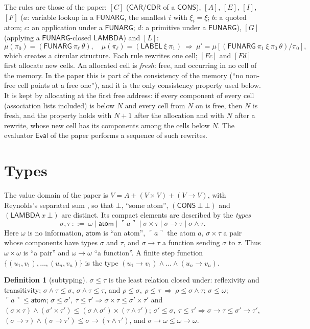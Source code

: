 \documentclass[11pt]{amsart}
\theoremstyle{definition}
\newtheorem{definition}[theorem]{Definition}
\theoremstyle{remark}
\newcommand{\kw}[1]{\mathsf{#1}}
\newcommand{\at}[1]{\ulcorner #1\urcorner}
\newcommand{\Atom}{\mathsf{atom}}
\begin{document}
The rules are those of the paper:
$[C]$ ($\kw{CAR}/\kw{CDR}$ of a $\kw{CONS}$), $[A]$, $[E]$, $[I]$,
$[F]$ ($a$: variable lookup in a $\kw{FUNARG}$, the smallest $i$ with
$\xi_i=\xi$; $b$: a quoted atom; $c$: an application under a $\kw{FUNARG}$;
$d$: a primitive under a $\kw{FUNARG}$), $[G]$ (applying a
$\kw{FUNARG}$-closed $\kw{LAMBDA}$) and $[L]$:
\[
\mu(\pi_0)=(\kw{FUNARG}\ \pi_\ell\ \theta),\quad \mu(\pi_\ell)=(\kw{LABEL}\ \xi\ \pi_1)
\ \Longrightarrow\ \mu'=\mu[(\kw{FUNARG}\ \pi_1\ \xi\ \pi_0\ \theta)/\pi_0],
\]
which creates a circular structure. Each rule rewrites one cell; $[Fc]$ and
$[Fd]$ first allocate new cells. An allocated cell is \emph{fresh}: free, and
occurring in no cell of the memory. In the paper this is part of the
consistency of the memory (``no non-free cell points at a free one''), and
it is the only consistency property used below. It is kept by allocating at
the first free address: if every component of every cell (association lists
included) is below $N$ and every cell from $N$ on is free, then $N$ is fresh,
and the property holds with $N+1$ after the allocation and with $N$ after a
rewrite, whose new cell has its components among the cells below $N$. The
evaluator $\kw{Eval}$ of the paper performs a sequence of such rewrites.

\section{Types}

The value domain of the paper is $V=A+(V\times V)+(V\to V)$, with Reynolds's
separated sum \cite{Rey71}, so that $\bot$, ``some atom'', $(\kw{CONS}\ \bot\ \bot)$ and
$(\kw{LAMBDA}\ x\ \bot)$ are distinct. Its compact elements are described by
the \emph{types}
\[
\sigma,\tau\ ::=\ \omega\mid \Atom\mid \at{a}\mid \sigma\times\tau\mid \sigma\to\tau\mid \sigma\wedge\tau .
\]
Here $\omega$ is no information, $\Atom$ is ``an atom'', $\at a$ the atom
$a$, $\sigma\times\tau$ a pair whose components have types $\sigma$ and
$\tau$, and $\sigma\to\tau$ a function sending $\sigma$ to $\tau$. Thus
$\omega\times\omega$ is ``a pair'' and $\omega\to\omega$ ``a function''. A finite step function
$\{(u_1,v_1),\dots,(u_n,v_n)\}$ is the type
$(u_1\to v_1)\wedge\dots\wedge(u_n\to v_n)$.

\begin{definition}[subtyping]
$\sigma\le\tau$ is the least relation closed under: reflexivity and
transitivity; $\sigma\wedge\tau\le\sigma$, $\sigma\wedge\tau\le\tau$, and
$\rho\le\sigma,\ \rho\le\tau\ \Rightarrow\ \rho\le\sigma\wedge\tau$;
$\sigma\le\omega$; $\at a\le\Atom$;
$\sigma\le\sigma',\ \tau\le\tau'\Rightarrow\sigma\times\tau\le\sigma'\times\tau'$
and $(\sigma\times\tau)\wedge(\sigma'\times\tau')\le(\sigma\wedge\sigma')\times(\tau\wedge\tau')$;
$\sigma'\le\sigma,\ \tau\le\tau'\Rightarrow\sigma\to\tau\le\sigma'\to\tau'$,
$(\sigma\to\tau)\wedge(\sigma\to\tau')\le\sigma\to(\tau\wedge\tau')$, and
$\sigma\to\omega\le\omega\to\omega$.
\end{definition}
\end{document}
